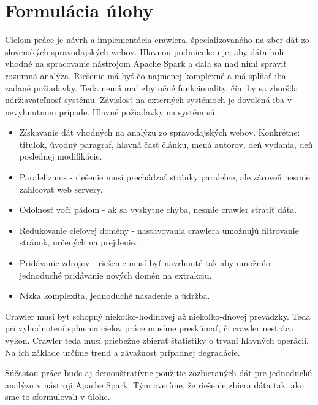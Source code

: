 \chapter*{Formulácia úlohy}


Cieľom práce je návrh a implementácia crawlera, špecializovaného na zber dát zo slovenských spravodajských webov. Hlavnou podmienkou je, aby dáta boli vhodné na spracovanie nástrojom Apache Spark a dala sa nad nimi spraviť rozumná analýza. Riešenie má byť čo najmenej komplexné a má spĺňať iba zadané požiadavky. Teda nemá mať zbytočné funkcionality, čím by sa zhoršila udržiavateľnosť systému. Závislosť na externých systémoch je dovolená iba v nevyhnutnom prípade. Hlavné požiadavky na systém sú: 

\begin{itemize}
    \item Získavanie dát vhodných na analýzu zo spravodajských webov. Konkrétne: titulok, úvodný paragraf, hlavná časť článku, mená autorov, deň vydania, deň poslednej modifikácie.
    \item Paralelizmus - riešenie musí prechádzať stránky paralelne, ale zároveň nesmie zahlcovať web servery.
    \item Odolnosť voči pádom - ak sa vyskytne chyba, nesmie crawler stratiť dáta.
    \item Redukovanie cieľovej domény - nastavovania crawlera umožnujú  filtrovanie stránok, určených na prejdenie.
    \item Pridávanie zdrojov - riešenie musí byť navrhnuté tak aby umožnilo jednoduché pridávanie nových domén na extrakciu. 
    \item Nízka komplexita, jednoduché nasadenie a údržba. 
\end{itemize}


Crawler musí byť schopný niekoľko-hodinovej až niekoľko-dňovej prevádzky. Teda pri vyhodnotení splnenia cieľov práce musíme preskúmať, či crawler nestráca výkon. Crawler teda musí priebežne zbierať štatistiky o trvaní hlavných operácii. Na ich základe určíme trend a závažnosť prípadnej degradácie. 

Súčasťou práce bude aj demonštratívne použitie zozbieraných dát pre jednoduchú analýzu v nástroji Apache Spark. Tým overíme, že riešenie zbiera dáta tak, ako sme to sformulovali v úlohe.